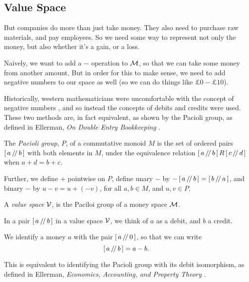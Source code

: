 \subsection{Value Space}

But companies do more than just take money\footnotemark.
They also need to purchase raw materials, and pay employees.
So we need some way to represent not only the money, but also whether it's a gain, or a loss.

Naively, we want to add a $-$ operation to $\mathcal{M}$, so that we can take some money from another amount.
But in order for this to make sense, we need to add negative numbers to our space as well (so we can do things like $\pounds 0 - \pounds 10$).

Historically, western mathematicians were uncomfortable with the concept of negative numbers \cite{arithmetica},
and so instead the concepts of debits and credits were used.
These two methods are, in fact equivalent, as shown by the Pacioli group, as defined in Ellerman, \emph{On Double Entry Bookkeeping} \cite{ellerman-tmt}.

\begin{definition}
    The \emph{Pacioli group}, $P$, of a commutative monoid $M$ is the set of ordered pairs $\left[\,a\,/\!/\,b\,\right]$ with both elements in $M$,
    under the equivalence relation $\left[\,a\,/\!/\,b\,\right] R \left[\,c\,/\!/\,d\,\right]$ when $a + d = b + c$.

    Further, we define $+$ pointwise on $P$, define unary $-$ by $- \left[\,a\,/\!/\,b\,\right] = \left[\,b\,/\!/\,a\,\right]$, and binary $-$ by $u - v = u + (- v)$,
    for all $a, b \in M$, and $u, v \in P$.
\end{definition}

\begin{definition}
    A \emph{value space} $\mathcal{V}$, is the Paciloi group of a money space $\mathcal{M}$.
\end{definition}

In a pair $\left[\,a\,/\!/\,b\,\right]$ in a value space $\mathcal{V}$, we think of $a$ as a debit, and $b$ a credit.

\begin{notation}
    We identify a money $a$ with the pair $\left[\,a\,/\!/\,0\,\right]$, so that we can write
    \begin{equation*}
        \left[\,a\,/\!/\,b\,\right] = a - b.
    \end{equation*}

    This is equivalent to identifying the Pacioli group with its debit isomorphism, as defined in Ellerman, \emph{Economics, Accounting, and Property Theory} \cite{ellerman-eapt}.
\end{notation}

